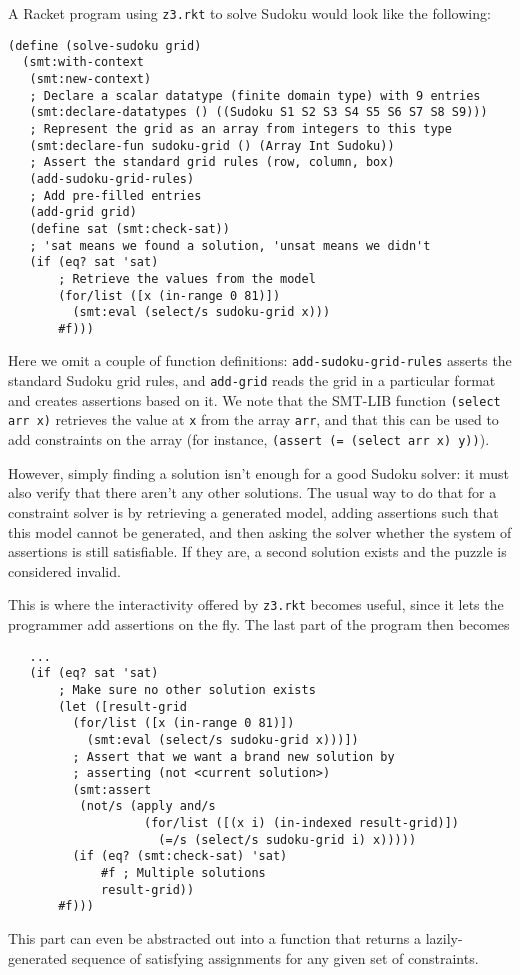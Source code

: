 A Racket program using \texttt{z3.rkt} to solve Sudoku would look like the
following:

\begin{verbatim}
(define (solve-sudoku grid)
  (smt:with-context
   (smt:new-context)
   ; Declare a scalar datatype (finite domain type) with 9 entries
   (smt:declare-datatypes () ((Sudoku S1 S2 S3 S4 S5 S6 S7 S8 S9)))
   ; Represent the grid as an array from integers to this type
   (smt:declare-fun sudoku-grid () (Array Int Sudoku))
   ; Assert the standard grid rules (row, column, box)
   (add-sudoku-grid-rules)
   ; Add pre-filled entries
   (add-grid grid)
   (define sat (smt:check-sat))
   ; 'sat means we found a solution, 'unsat means we didn't
   (if (eq? sat 'sat)
       ; Retrieve the values from the model
       (for/list ([x (in-range 0 81)])
         (smt:eval (select/s sudoku-grid x)))
       #f)))
\end{verbatim}

Here we omit a couple of function definitions: \texttt{add-sudoku-grid-rules}
asserts the standard Sudoku grid rules, and \texttt{add-grid} reads the grid in
a particular format and creates assertions based on it. We note that the SMT-LIB
function \texttt{(select arr x)} retrieves the value at \texttt{x} from the
array \texttt{arr}, and that this can be used to add constraints on the array
(for instance, \texttt{(assert (= (select arr x) y))}).

However, simply finding a solution isn't enough for a good Sudoku solver: it
must also verify that there aren't any other solutions. The usual way to do that
for a constraint solver is by retrieving a generated model, adding assertions
such that this model cannot be generated, and then asking the solver whether the
system of assertions is still satisfiable. If they are, a second solution
exists and the puzzle is considered invalid.

This is where the interactivity offered by \texttt{z3.rkt} becomes useful, since
it lets the programmer add assertions on the fly. The last part of the program
then becomes

\begin{verbatim}
   ...
   (if (eq? sat 'sat)
       ; Make sure no other solution exists
       (let ([result-grid
         (for/list ([x (in-range 0 81)])
           (smt:eval (select/s sudoku-grid x)))])
         ; Assert that we want a brand new solution by
         ; asserting (not <current solution>)
         (smt:assert
          (not/s (apply and/s
                   (for/list ([(x i) (in-indexed result-grid)])
                     (=/s (select/s sudoku-grid i) x)))))
         (if (eq? (smt:check-sat) 'sat)
             #f ; Multiple solutions
             result-grid))
       #f)))
\end{verbatim}

This part can even be abstracted out into a function that returns a lazily-
generated sequence of satisfying assignments for any given set of constraints.
